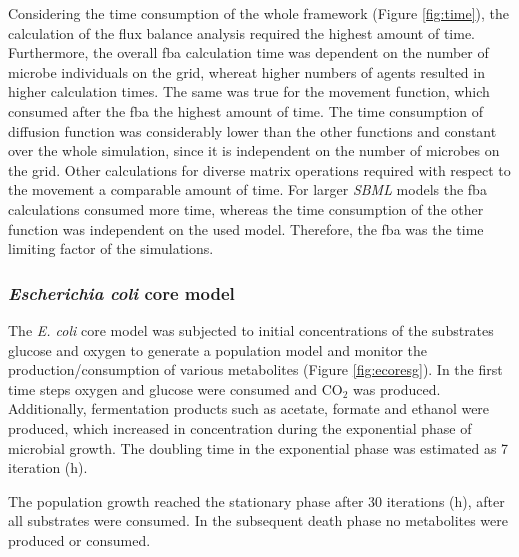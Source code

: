 Considering the time consumption of the whole framework (Figure \hyperref[fig:time]{\ref{fig:time}}), the calculation of the flux balance analysis required the highest amount of time.
Furthermore, the overall fba calculation time was dependent on the number of microbe individuals on the grid, whereat higher numbers of agents resulted in higher calculation times. The same was true for the movement function, which consumed after the fba the highest amount of time. The time consumption of diffusion function was considerably lower than the other functions and constant over the whole simulation, since it is independent on the number of microbes on the grid. Other calculations for diverse matrix operations required with respect to the movement a comparable amount of time.
For larger \textit{SBML} models the fba calculations consumed more time, whereas the time consumption of the other function was independent on the used model. Therefore, the fba was the time limiting factor of the simulations.
\subsubsection{\textit{Escherichia coli} core model}
The \textit{E. coli} core model was subjected to initial concentrations of the substrates glucose and oxygen to generate a population model and monitor the production/consumption of various metabolites (Figure \hyperref[fig:ecoresg]{\ref{fig:ecoresg}}). In the first time steps oxygen and glucose were consumed and CO$_2$ was produced. Additionally, fermentation products such as acetate, formate and ethanol were produced, which increased in concentration during the exponential phase of microbial growth. The doubling time in the exponential phase was estimated as 7 iteration (h).

The population growth reached the stationary phase after 30 iterations (h), after all substrates were consumed. In the subsequent death phase no metabolites were produced or consumed.

